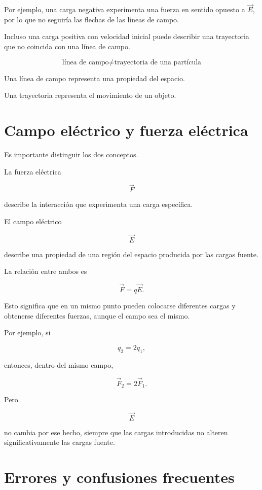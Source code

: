 Por ejemplo, una carga negativa experimenta una fuerza en sentido opuesto a
\(\vec E\), por lo que no seguiría las flechas de las líneas de campo.

Incluso una carga positiva con velocidad inicial puede describir una trayectoria que
no coincida con una línea de campo.

\begin{idea}

\[
\boxed{\text{línea de campo}\neq\text{trayectoria de una partícula}}
\]

Una línea de campo representa una propiedad del espacio.

Una trayectoria representa el movimiento de un objeto.

\end{idea}


\section{Campo eléctrico y fuerza eléctrica}

Es importante distinguir los dos conceptos.

La fuerza eléctrica

\[
\vec F
\]

describe la interacción que experimenta una carga específica.

El campo eléctrico

\[
\vec E
\]

describe una propiedad de una región del espacio producida por las cargas fuente.

La relación entre ambos es

\[
\boxed{\vec F=q\vec E}.
\]

Esto significa que en un mismo punto pueden colocarse diferentes cargas y obtenerse
diferentes fuerzas, aunque el campo sea el mismo.

Por ejemplo, si

\[
q_2=2q_1,
\]

entonces, dentro del mismo campo,

\[
\vec F_2=2\vec F_1.
\]

Pero

\[
\vec E
\]

no cambia por ese hecho, siempre que las cargas introducidas no alteren
significativamente las cargas fuente.


\section{Errores y confusiones frecuentes}


